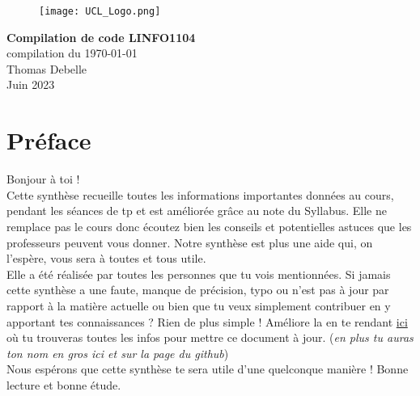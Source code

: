 \documentclass{report}
\begin{document}
\begin{titlepage}
    \begin{figure}
        \texttt{[image: UCL\_Logo.png]}
        \label{fig:my_label}
    \end{figure}

    \hspace*{100cm}
    \centering
    \vspace*{7cm}

    {\Huge \textbf{Compilation de code LINFO1104}}\\
    \vspace*{0.25cm}
    compilation du \today\\
    \vspace*{0.25cm}
    \Large{Thomas Debelle}\\

    \vspace*{9.5cm} %
    {\Large Juin 2023}
\end{titlepage}

\tableofcontents
\newpage

\section*{Préface}

Bonjour à toi !\\

Cette synthèse recueille toutes les informations importantes données au cours, pendant les séances de tp et est améliorée grâce au note du Syllabus. Elle ne remplace pas le cours donc écoutez bien les conseils et potentielles astuces que les professeurs peuvent vous donner. Notre synthèse est plus une aide qui, on l'espère, vous sera à toutes et tous utile.\\

Elle a été réalisée par toutes les personnes que tu vois mentionnées. Si jamais cette synthèse a une faute, manque de précision, typo ou n'est pas à jour par rapport à la matière actuelle ou bien que tu veux simplement contribuer en y apportant tes connaissances ? Rien de plus simple ! Améliore la en te rendant \href{http://www.github.com/Tfloow/Q4_EPL}{ici} où tu trouveras toutes les infos pour mettre ce document à jour. (\textit{en plus tu auras ton nom en gros ici et sur la page du github})\\

Nous espérons que cette synthèse te sera utile d'une quelconque manière ! Bonne lecture et bonne étude.
\end{document}
